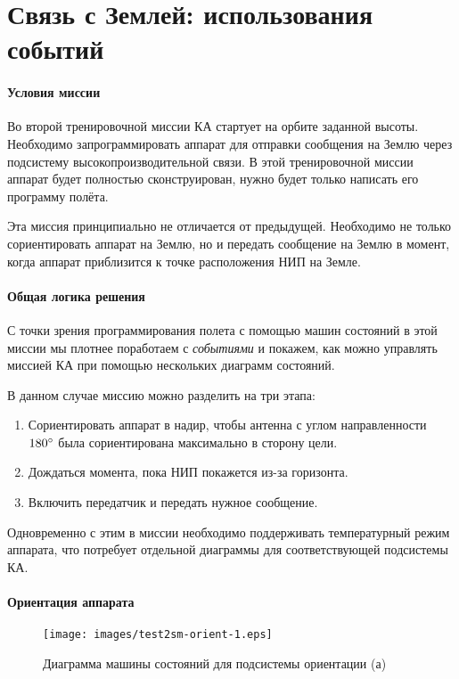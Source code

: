 \documentclass[12pt,a4paper]{article}
\begin{document}
\clearpage
\section{Связь с Землей: использования событий}

\paragraph{Условия миссии} Во второй тренировочной миссии КА стартует на орбите заданной высоты. Необходимо
запрограммировать аппарат для отправки сообщения на Землю через подсистему
высокопроизводительной связи. В этой тренировочной миссии аппарат будет полностью
сконструирован, нужно будет только написать его программу полёта.

Эта миссия принципиально не отличается от предыдущей. Необходимо не только сориентировать
аппарат на Землю, но и передать сообщение на Землю в момент, когда аппарат приблизится к
точке расположения НИП на Земле.

\paragraph{Общая логика решения} С точки зрения программирования полета с помощью машин
состояний в этой миссии мы плотнее поработаем с \emph{событиями} и покажем, как можно
управлять миссией КА при помощью нескольких диаграмм состояний.

В данном случае миссию можно разделить на три этапа:

\begin{enumerate}
\item Сориентировать аппарат в надир, чтобы антенна с углом направленности
  $180\degree$ была сориентирована максимально в сторону цели.
\item Дождаться момента, пока НИП покажется из-за горизонта.
\item Включить передатчик и передать нужное сообщение.
\end{enumerate}

Одновременно с этим в миссии необходимо поддерживать температурный режим аппарата, что
потребует отдельной диаграммы для соответствующей подсистемы КА.

\paragraph{Ориентация аппарата}

\begin{figure}[tbh]
  \begin{center}
    \texttt{[image: images/test2sm-orient-1.eps]}
    \caption{Диаграмма машины состояний для подсистемы ориентации (а)}
    \label{Pic:Test2SM-Orient-1}
  \end{center}
\end{figure}
\end{document}
